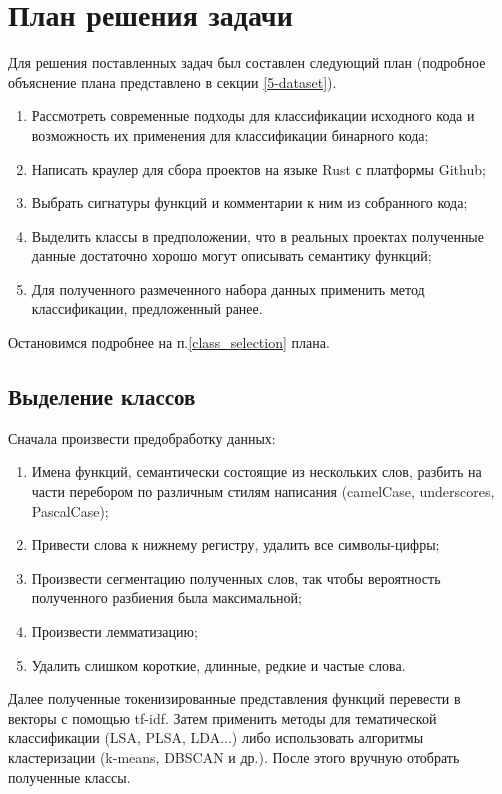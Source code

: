 \section{План решения задачи}
Для решения поставленных задач был составлен следующий план (подробное объяснение плана представлено в секции \ref{5-dataset}).
\begin{enumerate}
    \item Рассмотреть современные подходы для классификации исходного кода и возможность их применения для классификации бинарного кода;
    \item Написать краулер для сбора проектов на языке Rust с платформы Github;
    \item Выбрать сигнатуры функций и комментарии к ним из собранного кода;
    \item \label{class_selection} Выделить классы в предположении, что в реальных проектах полученные данные достаточно хорошо могут описывать семантику функций;
    \item Для полученного размеченного набора данных применить метод классификации, предложенный ранее.
\end{enumerate}

Остановимся подробнее на п.\ref{class_selection} плана.

\subsection{Выделение классов}
Сначала произвести предобработку данных:
\begin{enumerate}
    \item Имена функций, семантически состоящие из нескольких слов, разбить на части перебором по различным стилям написания (camelCase, underscores, PascalCase);
    \item Привести слова к нижнему регистру, удалить все символы-цифры;
    \item Произвести сегментацию полученных слов, так чтобы вероятность полученного разбиения была максимальной;
    \item Произвести лемматизацию;
    \item Удалить слишком короткие, длинные, редкие и частые слова.
\end{enumerate}

Далее полученные токенизированные представления функций перевести в векторы с помощью tf-idf. Затем применить методы для тематической классификации (LSA, PLSA, LDA...) либо использовать алгоритмы кластеризации (k-means, DBSCAN и др.). После этого вручную отобрать полученные классы.